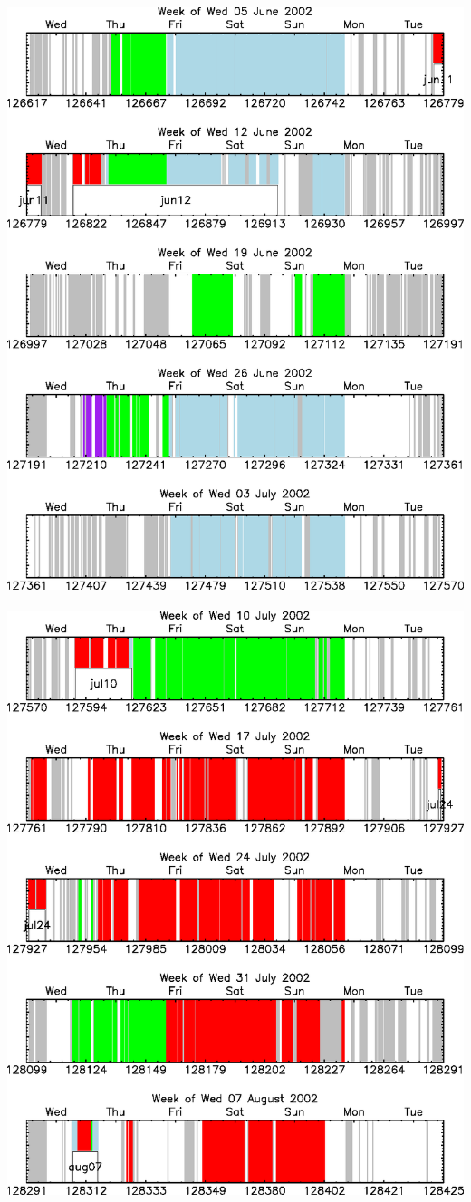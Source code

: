 \documentclass[12pt]{article}
\begin{document}
\mbox{ } \vfill \includegraphics[width=\linewidth]{fits2_dates07.eps} \vfill \mbox{ } \pagebreak
\mbox{ } \vfill \includegraphics[width=\linewidth]{fits2_dates08.eps} \vfill \mbox{ } \pagebreak
\end{document}
